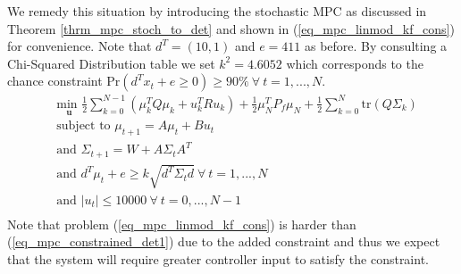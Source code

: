 We remedy this situation by introducing the stochastic MPC as discussed in Theorem \ref{thrm_mpc_stoch_to_det} and shown in (\ref{eq_mpc_linmod_kf_cons}) for convenience. Note that $d^T = (10, 1)$ and $e=411$ as before. By consulting a Chi-Squared Distribution table we set $k^2 = 4.6052$ which corresponds to the chance constraint $\text{Pr}(d^Tx_t + e \geq 0) \geq 90\% ~\forall ~t=1,...,N$.
\begin{equation}
\begin{aligned}
&\underset{\mathbf{u}}{\text{min }} \frac{1}{2}\sum_{k=0}^{N-1} \left( \mu_k^TQ\mu_k + u_k^TRu_k \right) + \frac{1}{2}\mu_N^TP_f\mu_N + \frac{1}{2}\sum_{k=0}^N \text{tr}(Q\Sigma_k) \\
& \text{subject to } \mu_{t+1}=A\mu_t + Bu_t \\
& \text{and } \Sigma_{t+1} = W+A\Sigma_t A^T \\
& \text{and } d^T\mu_t + e \geq k\sqrt{d^T \Sigma_t d} ~\forall ~t=1,...,N\\
& \text{and } |u_t| \leq 10000 ~\forall ~t=0,...,N-1\\
\end{aligned}
\label{eq_mpc_linmod_kf_cons}
\end{equation}
Note that problem (\ref{eq_mpc_linmod_kf_cons}) is harder than (\ref{eq_mpc_constrained_det1}) due to the added constraint and thus we expect that the system will require greater controller input to satisfy the constraint. 

